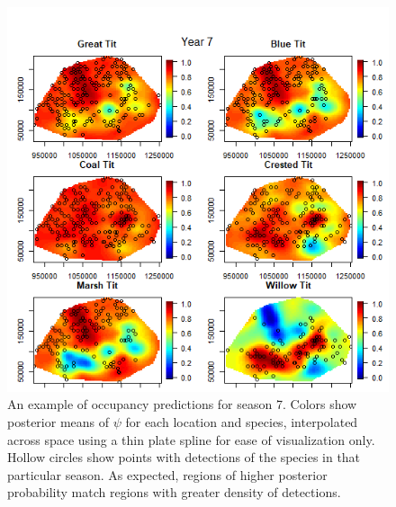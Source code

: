 \begin{figure}[ht]
  \centering
  \includegraphics[width=5.5in]{psi7.png}
  \caption{An example of occupancy predictions for season 7.  Colors show posterior means of $\psi$ for each location and species, interpolated across space using a thin plate spline for ease of visualization only.  Hollow circles show points with detections of the species in that particular season.  As expected, regions of higher posterior probability match regions with greater density of detections.}
  \label{figure:psi7}
\end{figure}

\clearpage
